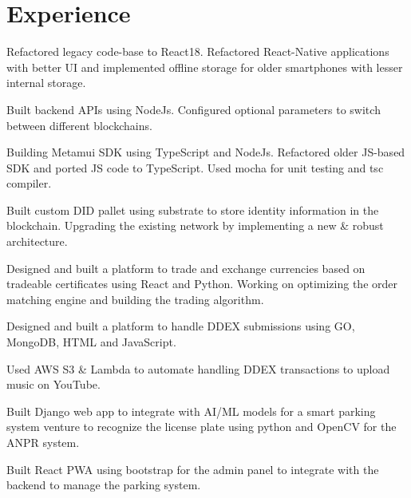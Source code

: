\documentclass[]{assets/deedy-resume-openfont}
\begin{document}
  \section{Experience}
  \hfill {}
      \begin{tightemize}
       \item Refactored legacy code-base to React18. Refactored React-Native applications with better UI and implemented offline storage for older smartphones with lesser internal storage.
       \item Built backend APIs using NodeJs. Configured optional parameters to switch between different blockchains.
       \item Building Metamui SDK using TypeScript and NodeJs. Refactored older JS-based SDK and ported JS code to TypeScript. Used mocha for unit testing and tsc compiler.
       \item Built custom DID pallet using substrate to store identity information in the blockchain. Upgrading the existing network by implementing a new \& robust architecture.
       \item Designed and built a platform to trade and exchange currencies based on tradeable certificates using React and Python. Working on optimizing the order matching engine and building the trading algorithm.

      \end{tightemize}
      \sectionsep
  \hfill {}
      \begin{tightemize}
\item Designed and built a platform to handle DDEX submissions using GO, MongoDB, HTML and JavaScript.
\item  Used AWS S3 \& Lambda to automate handling DDEX transactions to upload music on YouTube. 
\end{tightemize}
      \sectionsep
  \hfill {}
      \begin{tightemize}
\item Built Django web app to integrate with AI/ML models for a smart parking system venture to recognize the license plate using python and OpenCV for the ANPR system. 
\item Built React PWA using bootstrap for the admin panel to integrate with the backend to manage the parking system.
\end{tightemize}
      \sectionsep
%
%
\end{document}

